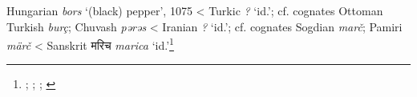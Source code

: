 \begin{etymology}\label{ety:bors}
Hungarian \textit{bors} `(black) pepper', 1075
< Turkic \textit{?} `id.'; cf. cognates Ottoman Turkish \textit{burç}; Chuvash \textit{pərəs}
< Iranian \textit{?} `id.'; cf. cognates Sogdian \textit{marč}; Pamiri \textit{märč}
< Sanskrit {मरिच} \textit{marica} `id.'\footnote{\textcite{zaicz_etimologiai_2006}; \textcite{zaicz_etimologiai_2006}; \textcite{zaicz_etimologiai_2006}; \textcite[790]{monier-williams_sanskrit-english_1899}}
\end{etymology}